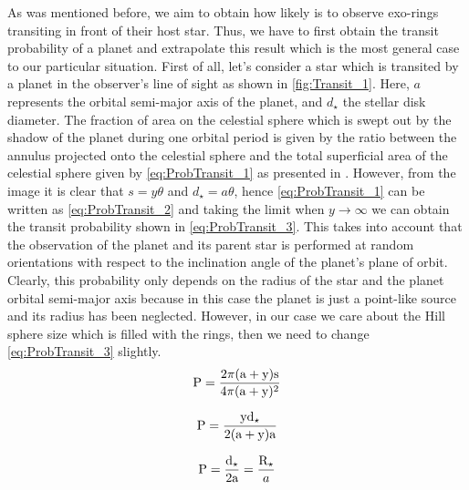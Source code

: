 As was mentioned before, we aim to obtain how likely is to observe exo-rings transiting in front of their host star. Thus, we have to first obtain the transit probability of a planet and extrapolate this result which is the most general case to our particular situation. First of all, let's consider a star which is transited by a planet in the observer's line of sight as shown in \autoref{fig:Transit_1}. Here, $a$ represents the orbital semi-major axis of the planet, and $d_\star$ the stellar disk diameter. The fraction of area on the celestial sphere which is swept out by the shadow of the planet during one orbital period is given by the ratio between the annulus projected onto the celestial sphere and the total superficial area of the celestial sphere given by \autoref{eq:ProbTransit_1} as presented in \citeyear{1984Icar...58..121B}. However, from the image it is clear that $s = y\theta$ and $d_\star = a\theta$, hence \autoref{eq:ProbTransit_1} can be written as \autoref{eq:ProbTransit_2} and taking the limit when $y \rightarrow \infty$ we can obtain the transit probability shown in \autoref{eq:ProbTransit_3}. This takes into account that the observation of the planet and its parent star is performed at random orientations with respect to the inclination angle of the planet's plane of orbit. Clearly, this probability only depends on the radius of the star and the planet orbital semi-major axis because in this case the planet is just a point-like source and its radius has been neglected. However, in our case we care about the Hill sphere size which is filled with the rings, then we need to change \autoref{eq:ProbTransit_3} slightly.\\ 

\begingroup
\Large
\begin{equation}
\textnormal{P} = \frac{2\pi (\textnormal{a} + \textnormal{y}) \textnormal{s}}{4\pi (\textnormal{a} + \textnormal{y})^2}
 \label{eq:ProbTransit_1}
\end{equation}
\endgroup

\begingroup
\Large
\begin{equation}
\textnormal{P} = \frac{\textnormal{y}\textnormal{d}_\star}{2 (\textnormal{a} + \textnormal{y}) \textnormal{a}}
 \label{eq:ProbTransit_2}
\end{equation}
\endgroup

\begingroup
\Large
\begin{equation}
\textnormal{P} = \frac{\textnormal{d}_\star}{2 \textnormal{a}} = \frac{\textnormal{R}_\star}{a}
 \label{eq:ProbTransit_3}
\end{equation}
\endgroup\\

